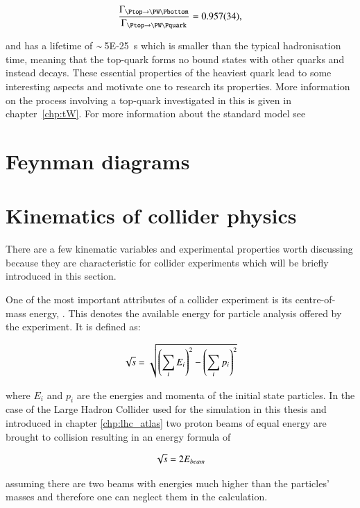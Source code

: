 \begin{align}
\frac{\Gamma_{\Ptop \rightarrow \PW \Pbottom}}{\Gamma_{\Ptop \rightarrow \PW \Pquark}} = \SI{0.957(34)}{},
\end{align}

and has a lifetime of $\sim\!$ \SI{5E-25}{\second} which is smaller than the typical hadronisation time, meaning that the top-quark forms no bound states with other quarks and instead decays.
These essential properties of the heaviest quark lead to some interesting aspects and motivate one to research its properties.
More information on the process involving a top-quark investigated in this is given in chapter~\ref{chp:tW}.
For more information about the standard model see ~\cite{thomson, griffiths}

\section{Feynman diagrams}



\section{Kinematics of collider physics}

There are a few kinematic variables and experimental properties worth discussing because they are characteristic for collider experiments which will be briefly introduced in this section.

One of the most important attributes of a collider experiment is its centre-of-mass energy, \Ecms. This denotes the available energy for particle analysis offered by the experiment.
It is defined as:

\begin{align}
\sqrt{s} = \sqrt{ \left( \sum_i E_i \right)^2 - \left( \sum_i p_i \right)^2 }
\end{align}


where $E_i$ and $p_i$ are the energies and momenta of the initial state particles.
In the case of the Large Hadron Collider used for the simulation in this thesis and introduced in chapter \ref{chp:lhc_atlas} two proton beams of equal energy are brought to collision resulting in an energy formula of

\begin{align}
\sqrt{s} = 2 E_{beam}
\end{align}

assuming there are two beams with energies much higher than the particles' masses and therefore one can neglect them in the calculation.

